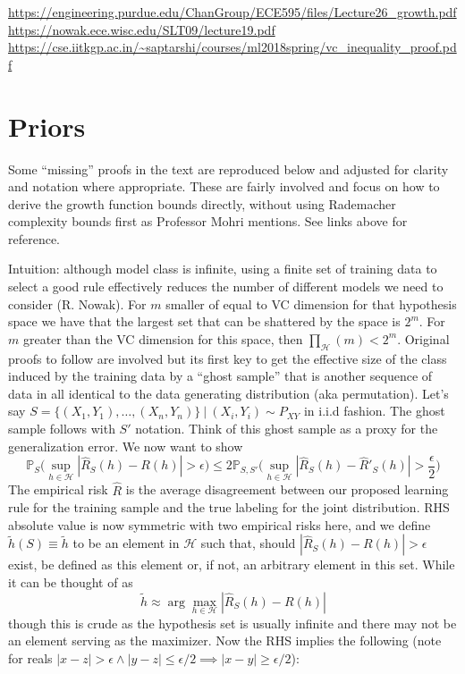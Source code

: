 \begin{flushleft}
	\url{https://engineering.purdue.edu/ChanGroup/ECE595/files/Lecture26_growth.pdf}\\
	\url{https://nowak.ece.wisc.edu/SLT09/lecture19.pdf}\\
	\url{https://cse.iitkgp.ac.in/~saptarshi/courses/ml2018spring/vc_inequality_proof.pdf}\\

	\section{Priors}

	Some ``missing'' proofs in the text are reproduced below and adjusted for
	clarity and notation where appropriate. These are fairly involved and focus on
	how to derive the growth function bounds directly, without using Rademacher
	complexity bounds first as Professor Mohri mentions. See links above for
	reference.

	Intuition: although model class is infinite, using a finite set of training
	data to select a good rule effectively reduces the number of different models
	we need to consider (R. Nowak). For $m$ smaller of equal to VC dimension for
	that hypothesis space we have that the largest set that can be shattered by the
	space is $2^m$. For $m$ greater than the VC dimension for this space, then
	$\prod_{\mathcal{H}}(m) < 2^m$. Original proofs to follow are involved but its
	first key to get the effective size of the class induced by the training data
	by a ``ghost sample'' that is another sequence of data in all identical to the
	data generating distribution (aka permutation). Let's say $S = \{(X_1, Y_1),
		\ldots, (X_n, Y_n)\}~|~(X_i,Y_i) \sim P_{XY}$ in i.i.d fashion. The ghost
	sample follows with $S'$ notation. Think of this ghost sample as a proxy for the generalization error. We now want to show
	$$\mathbb{P}_S\bigl(\sup_{h \in \mathcal{H}} |\hat{R}_S(h) - R(h)| >
		\epsilon\bigr) \leq 2\mathbb{P}_{S, S'}\bigl(\sup_{h \in
			\mathcal{H}}|\hat{R}_S(h)-\hat{R}'_S(h)| > \frac{\epsilon}{2}\bigr)$$ The
	empirical risk $\hat{R}$ is the average disagreement between our proposed
	learning rule for the training sample and the true labeling for the joint
	distribution. RHS absolute value is now symmetric with two empirical risks
	here, and we define $\tilde{h}(S) \equiv \tilde{h}$ to be an element in
	$\mathcal{H}$ such that, should $|\hat{R}_S(h) - R(h)| > \epsilon$ exist, be
	defined as this element or, if not, an arbitrary element in this set. While it
	can be thought of as $$\tilde{h} \approx \arg \max_{h \in \mathcal{H}}
		|\hat{R}_S(h) - R(h)| $$ though this is crude as the hypothesis set is usually
	infinite and there may not be an element serving as the maximizer. Now the RHS
	implies the following (note for reals $|x-z| > \epsilon \wedge |y-z| \leq
		\epsilon/2 \implies |x-y| \geq \epsilon/2$):


\end{flushleft}
